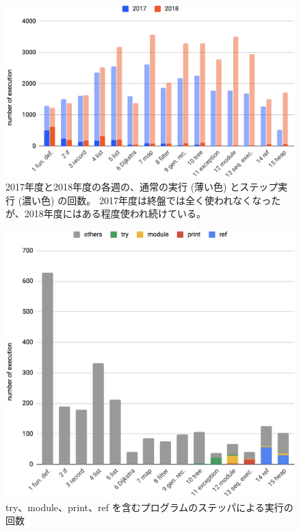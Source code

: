 \begin{figure}
  \begin{center}
    \includegraphics[width=15cm]{6/table1a.eps}
    \caption[ステッパが使用された回数]{
        2017年度と2018年度の各週の、通常の実行 (薄い色) とステップ実行 (濃い色) の回数。
        2017年度は終盤では全く使われなくなったが、2018年度にはある程度使われ続けている。
    }
    \label{figure:allExecution}
  \end{center}
\end{figure}

\begin{figure}[!t]
  \begin{center}
    \includegraphics[width=15cm]{6/table1b.eps}
    \caption[ステッパの実行のうち各構文を含むプログラムの実行の回数]{
        try、module、print、ref を含むプログラムのステッパによる実行の回数
    }
    \label{figure:stepExecution}
  \end{center}
\end{figure}

